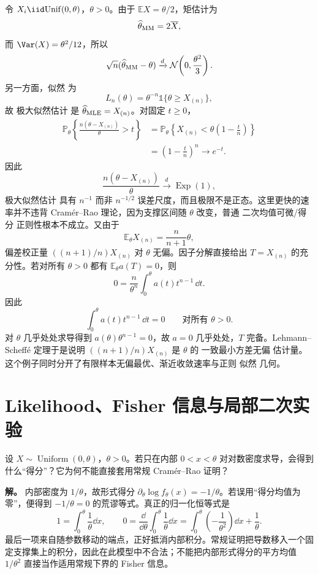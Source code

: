 \begin{exbox}
令 $X_i\iid\mathrm{Unif}(0,\theta)$，$\theta>0$。由于 $\mathbb E X=\theta/2$，矩估计为
\[
 \widehat\theta_{\rm MM}=2\overline X,
\]
而 $\Var(X)=\theta^2/12$，所以
\[
 \sqrt n(\widehat\theta_{\rm MM}-\theta)
 \xrightarrow{d}\mathcal N\!\left(0,\frac{\theta^2}{3}\right).
\]
另一方面，似然 为
\[
 L_n(\theta)
 =\theta^{-n}\mathds{1}\{\theta\ge X_{(n)}\},
\]
故 极大似然估计 是 $\widehat\theta_{\rm MLE}=X_{(n)}$。对固定 $t\ge0$，
\begin{align*}
 \mathbb P_\theta\!\left\{
 \frac{n(\theta-X_{(n)})}{\theta}>t
 \right\}
 &=\mathbb P_\theta\!\left\{
 X_{(n)}<\theta\left(1-\frac tn\right)
 \right\}\\
 &=\left(1-\frac tn\right)^n
 \longrightarrow e^{-t}.
\end{align*}
因此
\begin{equation*}\frac{n(\theta-X_{(n)})}{\theta}
 \xrightarrow{d}\operatorname{Exp}(1),
\end{equation*}
极大似然估计 具有 $n^{-1}$ 而非 $n^{-1/2}$ 误差尺度，而且极限不是正态。这里更快的速率并不违背 Cramér--Rao 理论，因为支撑区间随 $\theta$ 改变，普通 二次均值可微/得分 正则性根本不成立。又由于
\[
 \mathbb E_\theta X_{(n)}=\frac{n}{n+1}\theta,
\]
偏差校正量 $((n+1)/n)X_{(n)}$ 对 $\theta$ 无偏。因子分解直接给出 $T=X_{(n)}$ 的充分性。若对所有 $\theta>0$ 都有 $\mathbb E_\theta a(T)=0$，则
\[
 0=\frac{n}{\theta^n}
 \int_0^\theta a(t)t^{n-1}\,\dd t.
\]
因此
\[
 \int_0^\theta a(t)t^{n-1}\,\dd t=0
 \qquad\text{对所有 }\theta>0.
\]
对 $\theta$ 几乎处处求导得到 $a(\theta)\theta^{n-1}=0$，故 $a=0$ 几乎处处，$T$ 完备。Lehmann--Scheffé 定理于是说明 $((n+1)/n)X_{(n)}$ 是 $\theta$ 的 一致最小方差无偏 估计量。这个例子同时分开了有限样本无偏最优、渐近收敛速率与正则 似然 几何。
\end{exbox}

\section{Likelihood、Fisher 信息与局部二次实验}

\begin{workedexample}
设 \(X\sim\operatorname{Uniform}(0,\theta)\)，\(\theta>0\)。若只在内部 \(0<x<\theta\) 对对数密度求导，会得到什么“得分”？它为何不能直接套用常规 Cramér--Rao 证明？

\textbf{解。} 内部密度为 \(1/\theta\)，故形式得分 \(\partial_\theta\log f_\theta(x)=-1/\theta\)。若误用“得分均值为零”，便得到 \(-1/\theta=0\) 的荒谬等式。真正的归一化恒等式是
\[
1=\int_0^\theta\frac1\theta\dd x,\qquad
0=\frac{\dd}{\dd\theta}\int_0^\theta\frac1\theta\dd x
=\int_0^\theta\left(-\frac1{\theta^2}\right)\dd x+\frac1\theta.
\]
最后一项来自随参数移动的端点，正好抵消内部积分。常规证明把导数移入一个固定支撑集上的积分，因此在此模型中不合法；不能把内部形式得分的平方均值 \(1/\theta^2\) 直接当作适用常规下界的 Fisher 信息。
\end{workedexample}


